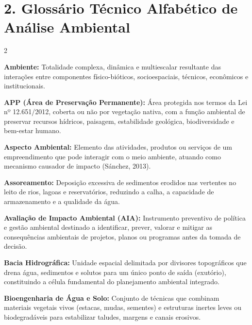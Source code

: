 \clearpage
\section*{2. Glossário Técnico Alfabético de Análise Ambiental}

\begin{multicols}{2}
\small
\setlength{\parskip}{4pt}

\noindent\textbf{\color{uefsNavy}Ambiente:} Totalidade complexa, dinâmica e multiescalar resultante das interações entre componentes físico-bióticos, socioespaciais, técnicos, econômicos e institucionais.

\noindent\textbf{\color{uefsNavy}APP (Área de Preservação Permanente):} Área protegida nos termos da Lei nº 12.651/2012, coberta ou não por vegetação nativa, com a função ambiental de preservar recursos hídricos, paisagem, estabilidade geológica, biodiversidade e bem-estar humano.

\noindent\textbf{\color{uefsNavy}Aspecto Ambiental:} Elemento das atividades, produtos ou serviços de um empreendimento que pode interagir com o meio ambiente, atuando como mecanismo causador de impacto (Sánchez, 2013).

\noindent\textbf{\color{uefsNavy}Assoreamento:} Deposição excessiva de sedimentos erodidos nas vertentes no leito de rios, lagoas e reservatórios, reduzindo a calha, a capacidade de armazenamento e a qualidade da água.

\noindent\textbf{\color{uefsNavy}Avaliação de Impacto Ambiental (AIA):} Instrumento preventivo de política e gestão ambiental destinado a identificar, prever, valorar e mitigar as consequências ambientais de projetos, planos ou programas antes da tomada de decisão.

\noindent\textbf{\color{uefsNavy}Bacia Hidrográfica:} Unidade espacial delimitada por divisores topográficos que drena água, sedimentos e solutos para um único ponto de saída (exutório), constituindo a célula fundamental do planejamento ambiental integrado.

\noindent\textbf{\color{uefsNavy}Bioengenharia de Água e Solo:} Conjunto de técnicas que combinam materiais vegetais vivos (estacas, mudas, sementes) e estruturas inertes leves ou biodegradáveis para estabilizar taludes, margens e canais erosivos.


\end{multicols}
